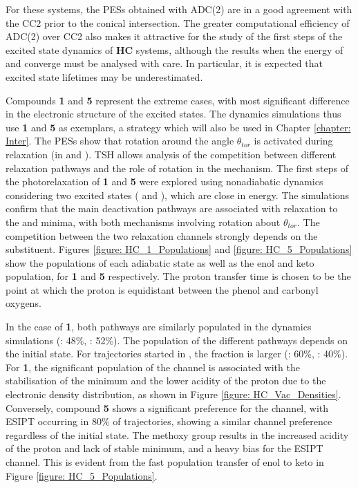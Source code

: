 For these systems, the \sone{} \acp{PES} obtained with ADC(2) are in a good agreement with the CC2 prior to the conical intersection. The greater computational efficiency of ADC(2) over CC2 also makes it attractive for the study of the first steps of the excited state dynamics of \textbf{HC} systems, although the results when the energy of \sone{} and \szero{} converge must be analysed with care. In particular, it is expected that excited state lifetimes may be underestimated. 

Compounds \textbf{1} and \textbf{5} represent the extreme cases, with most significant difference in the electronic structure of the excited states. The dynamics simulations thus use \textbf{1} and \textbf{5} as exemplars, a strategy which will also be used in Chapter \ref{chapter: Inter}.  The \acp{PES} show that rotation around the angle $\theta_{tor}$ is activated during relaxation (in \Estar{} and \Kstar{}). \ac{TSH} allows analysis of the competition between different relaxation pathways and the role of rotation in the mechanism. The first steps of the photorelaxation of \textbf{1} and \textbf{5} were explored using nonadiabatic dynamics considering two excited states (\stwo{} and \sone{}), which are close in energy. The simulations confirm that the main deactivation pathways are associated with relaxation to the \Kstar{} and \Estar{} minima, with both mechanisms involving  rotation about $\theta_{tor}$. The competition between the two relaxation channels strongly depends on the substituent. Figures \ref{figure: HC_1_Populations} and \ref{figure: HC_5_Populations} show the populations of each adiabatic state as well as the enol and keto population, for \textbf{1} and \textbf{5} respectively. The proton transfer time is chosen to be the point at which the proton is equidistant between the phenol and carbonyl oxygens.

In the case of \textbf{1}, both pathways are similarly populated in the dynamics simulations (\Kstar: 48\%, \Estar: 52\%). The population of the different pathways depends on the initial state. For trajectories started in \stwo{}, the fraction is larger (\Kstar: 60\%, \Estar: 40\%). For \textbf{1}, the significant population of the \Estar{} channel is associated with the stabilisation of the \Estar{} minimum and the lower acidity of the proton due to the electronic density distribution, as shown in Figure \ref{figure: HC_Vac_Densities}. Conversely, compound \textbf{5} shows a significant preference for the \Kstar{} channel, with ESIPT occurring in 80\% of trajectories, showing a similar channel preference regardless of the initial state. The methoxy group results in the increased acidity of the proton and lack of stable \Estar{} minimum, and a heavy bias for the ESIPT channel. This is evident from the fast population transfer of enol to keto in Figure \ref{figure: HC_5_Populations}.

